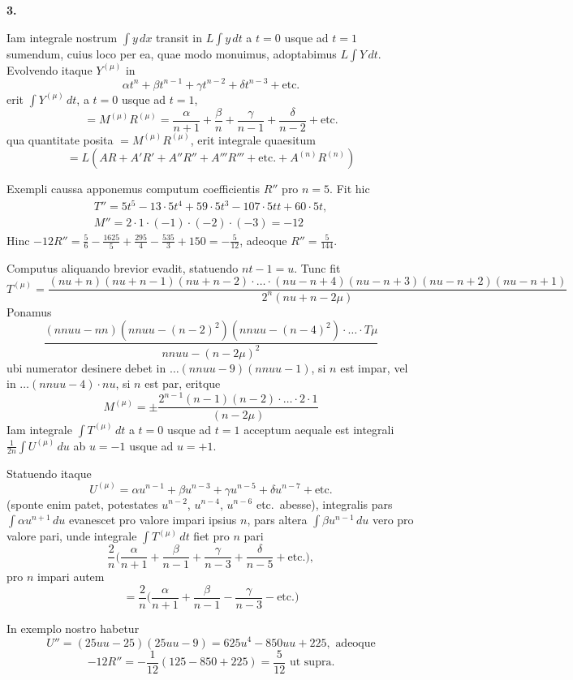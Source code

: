 \documentclass[12pt,a4paper]{article}
\newcommand{\art}[1]{\par\medskip\noindent\textbf{#1.}\par\nopagebreak\smallskip}
\begin{document}
\art{3}

Iam integrale nostrum $\int\!y\,dx$ transit in $L\int\!y\,dt$ a $t=0$ usque ad $t=1$ sumendum, cuius loco per ea, quae modo monuimus, adoptabimus $L\int\!Y\,dt$. Evolvendo itaque $Y^{(\mu)}$ in
\[
\alpha t^n + \beta t^{n-1} + \gamma t^{n-2} + \delta t^{n-3} + \text{etc.}
\]
erit $\int\!Y^{(\mu)}\,dt$, a $t=0$ usque ad $t=1$,
\[
= M^{(\mu)}R^{(\mu)} = \frac{\alpha}{n+1} + \frac{\beta}{n} + \frac{\gamma}{n-1} + \frac{\delta}{n-2} + \text{etc.}
\]
qua quantitate posita $=M^{(\mu)}R^{(\mu)}$, erit integrale quaesitum
\[
= L(AR + A'R' + A''R'' + A'''R''' + \text{etc.} + A^{(n)}R^{(n)})
\]

Exempli caussa apponemus computum coefficientis $R''$ pro $n=5$. Fit hic
\begin{gather*}
T'' = 5t^5 - 13\cdot5t^4 + 59\cdot5t^3 - 107\cdot5tt + 60\cdot5t,\\
M'' = 2\cdot1\cdot(-1)\cdot(-2)\cdot(-3) = -12
\end{gather*}
Hinc $-12R'' = \frac{5}{6} - \frac{1625}{5} + \frac{295}{4} - \frac{535}{3} + 150 = -\frac{5}{12}$, adeoque $R''=\frac{5}{144}$.

Computus aliquando brevior evadit, statuendo $nt-1=u$. Tunc fit
\[
T^{(\mu)} = \frac{(nu+n)(nu+n-1)(nu+n-2)\cdot\ldots\cdot(nu-n+4)(nu-n+3)(nu-n+2)(nu-n+1)}{2^n(nu+n-2\mu)}
\]
Ponamus
\[
\frac{(nnuu-nn)(nnuu-(n-2)^2)(nnuu-(n-4)^2)\cdot\ldots\cdot T\mu}{nnuu-(n-2\mu)^2}
\]
ubi numerator desinere debet in $\ldots(nnuu-9)(nnuu-1)$, si $n$ est impar, vel in $\ldots(nnuu-4)\cdot nu$, si $n$ est par, eritque
\[
M^{(\mu)} = \pm\frac{2^{n-1}(n-1)(n-2)\cdot\ldots\cdot2\cdot1}{(n-2\mu)}
\]
Iam integrale $\int\!T^{(\mu)}\,dt$ a $t=0$ usque ad $t=1$ acceptum aequale est integrali $\frac{1}{2n}\int\!U^{(\mu)}\,du$ ab $u=-1$ usque ad $u=+1$.

Statuendo itaque
\[
U^{(\mu)} = \alpha u^{n-1} + \beta u^{n-3} + \gamma u^{n-5} + \delta u^{n-7} + \text{etc.}
\]
(sponte enim patet, potestates $u^{n-2}$, $u^{n-4}$, $u^{n-6}$ etc.\ abesse), integralis pars $\int\!\alpha u^{n+1}\,du$ evanescet pro valore impari ipsius $n$, pars altera $\int\!\beta u^{n-1}\,du$ vero pro valore pari, unde integrale $\int\!T^{(\mu)}\,dt$ fiet pro $n$ pari
\[
\frac{2}{n}\bigl(\frac{\alpha}{n+1} + \frac{\beta}{n-1} + \frac{\gamma}{n-3} + \frac{\delta}{n-5} + \text{etc.}\bigr),
\]
pro $n$ impari autem
\[
= \frac{2}{n}\bigl(\frac{\alpha}{n+1} + \frac{\beta}{n-1} - \frac{\gamma}{n-3} - \text{etc.}\bigr)
\]

In exemplo nostro habetur
\[
U'' = (25uu-25)(25uu-9) = 625u^4 - 850uu + 225,\text{ adeoque}
\]
\[
-12R'' = -\frac{1}{12}(125 - 850 + 225) = \frac{5}{12}\text{ ut supra.}
\]
\end{document}
